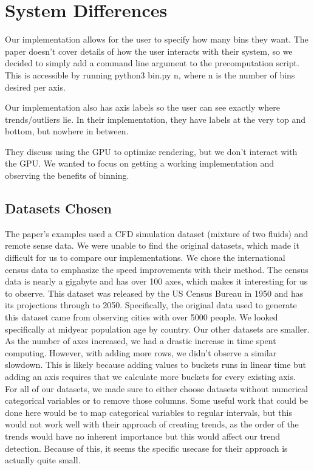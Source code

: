 \documentclass[	DIV=calc,%
			paper=a4,%
			fontsize=11pt,%
			twocolumn]{scrartcl}					%
\begin{document}
\section {System Differences}
Our implementation allows for the user to specify how many bins they want. The paper doesn't cover details of how the user interacts with their system, so we decided to simply add a command line argument to the precomputation script. This is accessible by running python3 bin.py n, where n is the number of bins desired per axis. 

Our implementation also has axis labels so the user can see exactly where trends/outliers lie. In their implementation,
they have labels at the very top and bottom, but nowhere in between. 

They discuss using the GPU to optimize rendering, but we don't interact with the GPU. We wanted to focus on 
getting a working implementation and observing the benefits of binning. 


\subsection {Datasets Chosen}
The paper's examples used a CFD simulation dataset (mixture of two fluids) and remote sense data. We were unable to find the original datasets, which made it difficult for us to compare our implementations. 
We chose the international census data to emphasize the speed improvements with their method. The census data is nearly a gigabyte and has over 100 axes, which makes it interesting for us to observe. This dataset was released by the US Census Bureau in 1950 and has its projections through to 2050. Specifically, the original data used to generate this dataset came from observing cities with over 5000 people. We looked specifically at midyear population age by country. 
Our other datasets are smaller. As the number of axes increased, we had a drastic increase in time spent computing. However, with adding more rows, we didn't observe a similar slowdown. This is likely because adding values to buckets runs in linear time but adding an axis requires that we calculate more buckets for every existing axis. \\

For all of our datasets, we made sure to either choose datasets without numerical categorical variables or to remove those columns. Some useful work that could be done here would be to
map categorical variables to regular intervals, but this would not work well with their approach of creating trends, as the order of the trends would have no inherent importance
but this would affect our trend detection. Because of this, it seems the specific usecase for their approach is actually quite small. 
\end{document}

